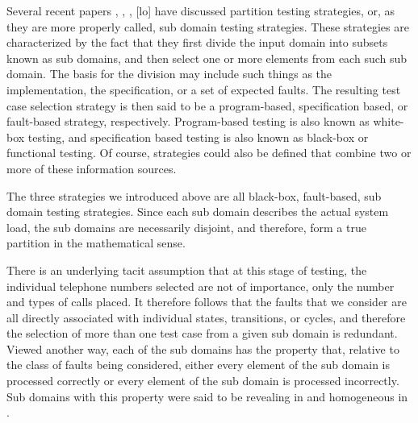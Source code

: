 \documentclass[journal, twoside]{IEEEtran}
\begin{document}
Several recent papers \cite{b2}, \cite{b3}, \cite{b4}, [lo] have discussed
partition testing strategies, or, as they are more properly
called, sub domain testing strategies. These strategies are characterized by the fact that they first divide the input domain into
subsets known as sub domains, and then select one or more
elements from each such sub domain. The basis for the division
may include such things as the implementation, the specification, or a set of expected faults. The resulting test case selection strategy is then said to be a program-based, specification based, or fault-based strategy, respectively. Program-based
testing is also known as white-box testing, and specification based testing is also known as black-box or functional testing.
Of course, strategies could also be defined that combine two or
more of these information sources.


The three strategies we introduced above are all black-box, \vspace{3cm}
fault-based, sub domain testing strategies. Since each sub domain describes the actual system load, the sub domains are
necessarily disjoint, and therefore, form a true partition in the
mathematical sense.

There is an underlying tacit assumption that at this stage of
testing, the individual telephone numbers selected are not of
importance, only the number and types of calls placed. It
therefore follows that the faults that we consider are all directly associated with individual states, transitions, or cycles,
and therefore the selection of more than one test case from a
given sub domain is redundant. Viewed another way, each of
the sub domains has the property that, relative to the class of
faults being considered, either every element of the sub domain
is processed correctly or every element of the sub domain is
processed incorrectly. Sub domains with this property were
said to be revealing in \cite{b11} and homogeneous in \cite{b4}. 
\end{document}
